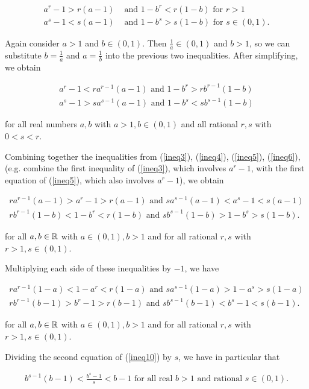 \begin{align}
    \label{ineq3}
    a^r - 1 > r(a - 1) &\text{ and } 1 - b^r < r(1 - b) \text{ for $r > 1$} \\
    \label{ineq4}
    a^s - 1 < s(a - 1) &\text{ and } 1 - b^s > s(1 - b) \text{ for $s \in (0, 1)$}.
\end{align}

Again consider $a > 1$ and $b \in (0, 1)$. Then $\frac{1}{a} \in (0, 1)$ and $b > 1$, so we can substitute $b = \frac{1}{a}$ and $a = \frac{1}{b}$ into the previous two inequalities. After simplifying, we obtain

\begin{align}
   \label{ineq5}
   a^r - 1 < r a^{r - 1}(a - 1) \text{ and } 1 - b^r > rb^{r - 1}(1 - b) \\
   \label{ineq6}
   a^s - 1 > sa^{s - 1}(a - 1) \text{ and } 1 - b^s < sb^{s - 1}(1 - b)
\end{align}

for all real numbers $a, b$ with $a > 1, b \in (0, 1)$ and all rational $r, s$ with $0 < s < r$.

Combining together the inequalities from (\ref{ineq3}), (\ref{ineq4}), (\ref{ineq5}), (\ref{ineq6}), (e.g. combine the first inequality of (\ref{ineq3}), which involves $a^r - 1$, with the first equation of (\ref{ineq5}), which also involves $a^r - 1$), we obtain

\begin{align}
    \label{ineq7}
    ra^{r - 1}(a - 1) > a^r - 1 > r(a - 1) \text{ and } sa^{s - 1}(a - 1) < a^s - 1 < s(a - 1) \\
    \label{ineq8}
    rb^{r - 1}(1 - b) < 1 - b^r < r(1 - b) \text{ and } sb^{s - 1}(1 - b) > 1 - b^s > s(1 - b).
\end{align}

for all $a, b \in \mathbb{R}$ with $a \in (0, 1), b > 1$ and for all rational $r, s$ with $r > 1, s \in (0, 1)$.

Multiplying each side of these inequalities by $-1$, we have

\begin{align}
    \label{ineq9}
    ra^{r - 1}(1 - a) < 1 - a^r < r(1 - a) \text{ and } sa^{s - 1}(1 - a) > 1- a^s > s(1 - a) \\
    \label{ineq10}
    rb^{r - 1}(b - 1) > b^r - 1 > r(b - 1) \text{ and } sb^{s - 1}(b - 1) < b^s - 1 < s(b - 1).
\end{align}

for all $a, b \in \mathbb{R}$ with $a \in (0, 1), b > 1$ and for all rational $r, s$ with $r > 1, s \in (0, 1)$.

Dividing the second equation of (\ref{ineq10}) by $s$, we have in particular that

\begin{align}
    \label{ineq11}
     b^{s - 1}(b - 1) < \frac{b^s - 1}{s} < b - 1 \text{ for all real $b > 1$ and rational $s \in (0, 1)$}.
\end{align}